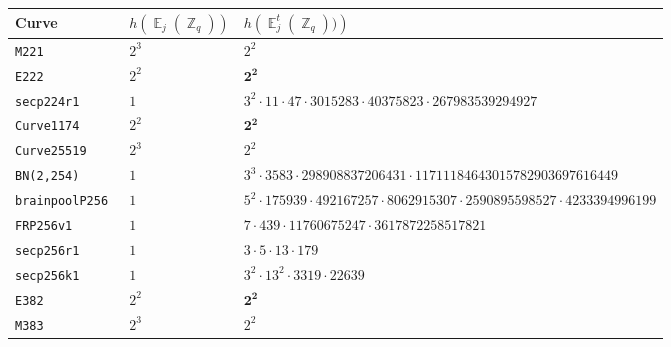 \documentclass[11pt,fleqn]{article}
\newcommand{\Ej}{\ensuremath{\BbbE_j(\BbbZ_q)} }
\newcommand{\Ejt}{\ensuremath{\BbbE^t_j(\BbbZ_q))} }
\begin{document}
%
\begin{tabularx}{\textwidth}{llR}
\textbf{Curve}            &$h(\Ej)$ & $h(\Ejt)$ \\
\hline
\texttt{\footnotesize M221         }& $\scriptstyle 2^3$    & $\scriptstyle 2^2                                                                  $\\
\texttt{\footnotesize E222         }& $\scriptstyle 2^2$    & $\scriptstyle \mathbf{2^2}                                                                  $\\
\texttt{\footnotesize secp224r1     }& $\scriptstyle 1  $    & $\scriptstyle 3^2 \cdot 11 \cdot 47 \cdot 3015283 \cdot 40375823 \cdot 267983539294927                 $\\
\texttt{\footnotesize Curve1174     }& $\scriptstyle 2^2$    & $\scriptstyle \mathbf{2^2}                                                                  $\\
\texttt{\footnotesize Curve25519    }& $\scriptstyle 2^3$    & $\scriptstyle 2^2                                                                  $\\
\texttt{\footnotesize BN(2,254)     }& $\scriptstyle 1  $    & $\scriptstyle 3^3 \cdot 3583 \cdot 298908837206431 \cdot 11711184643015782903697616449         $\\
\texttt{\footnotesize brainpoolP256 }& $\scriptstyle 1  $    & $\scriptstyle 5^2 \cdot 175939 \cdot 492167257 \cdot 8062915307 \cdot 2590895598527 \cdot 4233394996199$\\
\texttt{\footnotesize FRP256v1      }& $\scriptstyle 1  $    & $\scriptstyle 7 \cdot 439 \cdot 11760675247 \cdot 3617872258517821                             $\\
\texttt{\footnotesize secp256r1     }& $\scriptstyle 1  $    & $\scriptstyle 3 \cdot 5 \cdot 13 \cdot 179                                                     $\\
\texttt{\footnotesize secp256k1     }& $\scriptstyle 1  $    & $\scriptstyle 3^2 \cdot 13^2 \cdot 3319 \cdot 22639                                            $\\
\texttt{\footnotesize E382          }& $\scriptstyle 2^2$    & $\scriptstyle \mathbf{2^2}                                                                  $\\
\texttt{\footnotesize M383          }& $\scriptstyle 2^3$    & $\scriptstyle 2^2                                                                  $\\

\end{tabularx}
\end{document}
